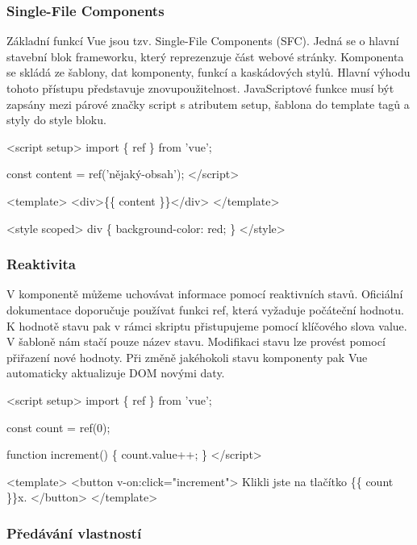 \subsubsection{Single-File Components}

Základní funkcí Vue jsou tzv. Single-File Components (SFC). Jedná se o hlavní stavební blok frameworku, který reprezenzuje část webové stránky. 
Komponenta se skládá ze šablony, dat komponenty, funkcí a kaskádových stylů. Hlavní výhodu tohoto přístupu představuje znovupoužitelnost. 
JavaScriptové funkce musí být zapsány mezi párové značky script s atributem setup, šablona do template tagů a styly do style bloku.\cite{vuemacrae,vue}

\begin{prog}
<script setup>
  import \{ ref \} from 'vue';
  
  const content = ref('nějaký-obsah');
</script>
  
<template>
  <div>\{\{ content \}\}</div>
</template>
  
<style scoped>
  div \{
    background-color: red;
  \}
</style>
\end{prog}

\subsubsection{Reaktivita}

V komponentě můžeme uchovávat informace pomocí reaktivních stavů. Oficiální dokumentace doporučuje používat funkci ref, která vyžaduje počáteční hodnotu. 
K hodnotě stavu pak v rámci skriptu přistupujeme pomocí klíčového slova value. V šabloně nám stačí pouze název stavu. 
Modifikaci stavu lze provést pomocí přiřazení nové hodnoty. Při změně jakéhokoli stavu komponenty pak Vue automaticky aktualizuje DOM novými daty.\cite{vue}

\begin{prog}
<script setup>
  import \{ ref \} from 'vue';
  
  const count = ref(0);

  function increment() \{
    count.value++;
  \}
</script>
  
<template>
  <button v-on:click="increment">
    Klikli jste na tlačítko \{\{ count \}\}x.
  </button>
</template>
\end{prog}

\subsubsection{Předávání vlastností}

